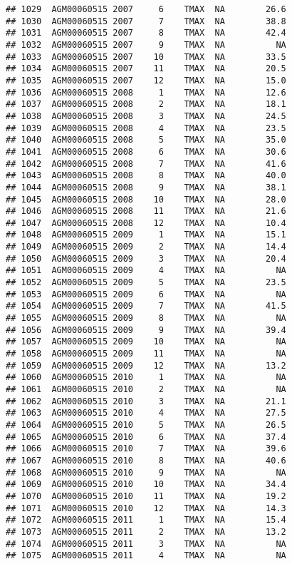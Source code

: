 \documentclass{article}\usepackage[]{graphicx}\usepackage[]{color}
\makeatletter
\newenvironment{kframe}{%
 \def\at@end@of@kframe{}%
 \ifinner\ifhmode%
  \def\at@end@of@kframe{\end{minipage}}%
  \begin{minipage}{\columnwidth}%
 \fi\fi%
 \def\FrameCommand##1{\hskip\@totalleftmargin \hskip-\fboxsep
 \colorbox{shadecolor}{##1}\hskip-\fboxsep
     \hskip-\linewidth \hskip-\@totalleftmargin \hskip\columnwidth}%
 \MakeFramed {\advance\hsize-\width
   \@totalleftmargin\z@ \linewidth\hsize
   \@setminipage}}%
 {\par\unskip\endMakeFramed%
 \at@end@of@kframe}
\newenvironment{knitrout}{}{} %
\makeatother
\begin{document}
\begin{knitrout}
\begin{kframe}
\begin{verbatim}
## 1029  AGM00060515 2007     6    TMAX  NA        26.6
## 1030  AGM00060515 2007     7    TMAX  NA        38.8
## 1031  AGM00060515 2007     8    TMAX  NA        42.4
## 1032  AGM00060515 2007     9    TMAX  NA          NA
## 1033  AGM00060515 2007    10    TMAX  NA        33.5
## 1034  AGM00060515 2007    11    TMAX  NA        20.5
## 1035  AGM00060515 2007    12    TMAX  NA        15.0
## 1036  AGM00060515 2008     1    TMAX  NA        12.6
## 1037  AGM00060515 2008     2    TMAX  NA        18.1
## 1038  AGM00060515 2008     3    TMAX  NA        24.5
## 1039  AGM00060515 2008     4    TMAX  NA        23.5
## 1040  AGM00060515 2008     5    TMAX  NA        35.0
## 1041  AGM00060515 2008     6    TMAX  NA        30.6
## 1042  AGM00060515 2008     7    TMAX  NA        41.6
## 1043  AGM00060515 2008     8    TMAX  NA        40.0
## 1044  AGM00060515 2008     9    TMAX  NA        38.1
## 1045  AGM00060515 2008    10    TMAX  NA        28.0
## 1046  AGM00060515 2008    11    TMAX  NA        21.6
## 1047  AGM00060515 2008    12    TMAX  NA        10.4
## 1048  AGM00060515 2009     1    TMAX  NA        15.1
## 1049  AGM00060515 2009     2    TMAX  NA        14.4
## 1050  AGM00060515 2009     3    TMAX  NA        20.4
## 1051  AGM00060515 2009     4    TMAX  NA          NA
## 1052  AGM00060515 2009     5    TMAX  NA        23.5
## 1053  AGM00060515 2009     6    TMAX  NA          NA
## 1054  AGM00060515 2009     7    TMAX  NA        41.5
## 1055  AGM00060515 2009     8    TMAX  NA          NA
## 1056  AGM00060515 2009     9    TMAX  NA        39.4
## 1057  AGM00060515 2009    10    TMAX  NA          NA
## 1058  AGM00060515 2009    11    TMAX  NA          NA
## 1059  AGM00060515 2009    12    TMAX  NA        13.2
## 1060  AGM00060515 2010     1    TMAX  NA          NA
## 1061  AGM00060515 2010     2    TMAX  NA          NA
## 1062  AGM00060515 2010     3    TMAX  NA        21.1
## 1063  AGM00060515 2010     4    TMAX  NA        27.5
## 1064  AGM00060515 2010     5    TMAX  NA        26.5
## 1065  AGM00060515 2010     6    TMAX  NA        37.4
## 1066  AGM00060515 2010     7    TMAX  NA        39.6
## 1067  AGM00060515 2010     8    TMAX  NA        40.6
## 1068  AGM00060515 2010     9    TMAX  NA          NA
## 1069  AGM00060515 2010    10    TMAX  NA        34.4
## 1070  AGM00060515 2010    11    TMAX  NA        19.2
## 1071  AGM00060515 2010    12    TMAX  NA        14.3
## 1072  AGM00060515 2011     1    TMAX  NA        15.4
## 1073  AGM00060515 2011     2    TMAX  NA        13.2
## 1074  AGM00060515 2011     3    TMAX  NA          NA
## 1075  AGM00060515 2011     4    TMAX  NA          NA

\end{verbatim}
\end{kframe}
\end{knitrout}
\end{document}
